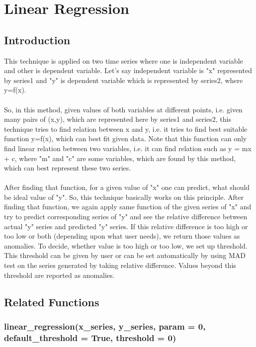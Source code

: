 \chapter{Linear Regression}

\section{Introduction}

This technique is applied on two time series where one is independent variable 
and other is dependent variable. Let's say independent variable 
is "x" represented by series1 and "y" is dependent variable which is 
represented by series2, where y=f(x). \\
\\
So, in this method, given values of both variables at different points, i.e. 
given many pairs of (x,y), which are represented here by series1 and series2, 
this technique tries to find relation between x and y, i.e. it tries to find 
best suitable function y=f(x), which can best fit given data. Note that this 
function can only find linear relation between two variables, i.e. it can find 
relation such as y = mx + c, where "m" and "c" are some variables, which are 
found by this method, which can best represent these two series. \\
\\
After finding that function, for a given value of "x" one can predict, what 
should be ideal value of "y". So, this technique basically works on this 
principle. After finding that function, we again apply same function of the 
given series of "x" and try to predict corresponding series of "y" and see the 
relative difference between actual "y" series and predicted "y" series. If this 
relative difference is too high or too low or both (depending upon 
what user needs), we return those values as anomalies. To decide, whether value 
is too high or too low, we set up threshold. This threshold can be given by user 
or can be set automatically by using MAD test on the series generated by taking 
relative difference. Values beyond this threshold are reported as anomalies.

\section{Related Functions}

\subsection{linear\_regression(x\_series, y\_series, param = 0, 
default\_threshold = True, threshold = 0)}


